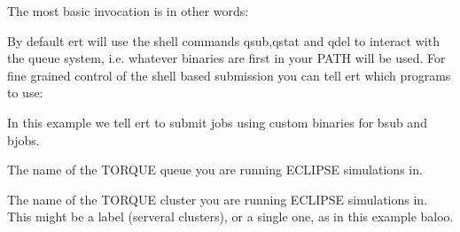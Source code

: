 \documentclass[a4paper,10pt,english]{sphinxmanual}
\begin{document}
The most basic invocation is in other words:

%
\begin{sphinxVerbatim}[commandchars=\\\{\}]
 
\end{sphinxVerbatim}


By default ert will use the shell commands qsub,qstat and qdel to interact with
the queue system, i.e. whatever binaries are first in your PATH will be used.
For fine grained control of the shell based submission you can tell ert which
programs to use:

%
\begin{sphinxVerbatim}[commandchars=\\\{\}]
 
   
   
   
\end{sphinxVerbatim}

In this example we tell ert to submit jobs using custom binaries for bsub and
bjobs.


The name of the TORQUE queue you are running ECLIPSE simulations in.

%
\begin{sphinxVerbatim}[commandchars=\\\{\}]
   
\end{sphinxVerbatim}


The name of the TORQUE cluster you are running ECLIPSE simulations in. This
might be a label (serveral clusters), or a single one, as in this example baloo.

%
\begin{sphinxVerbatim}[commandchars=\\\{\}]
   
\end{sphinxVerbatim}
\end{document}
